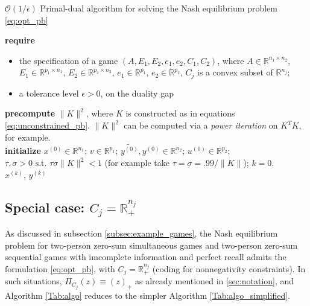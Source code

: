 \documentclass{article} %
\begin{document}
\begin{algorithm}[htb]
  \caption{$\mathcal{O}(1/\epsilon)$ Primal-dual algorithm for solving the Nash equilibrium problem \eqref{eq:opt_pb}}
  \textbf{require}
  \begin{itemize}
    \item the specification of a game $(A, E_1, E_2, e_1, e_2, C_1, C_2)$, where $A \in \mathbb{R}^{n_1 \times n_2}$,
  $E_1 \in \mathbb{R}^{p_1 \times n_1}$, $E_2 \in \mathbb{R}^{p_2 \times n_2}$, $e_1 \in \mathbb{R}^{p_1}$, $e_2 \in \mathbb{R}^{p_2}$, $C_j$ is a convex subset of $\mathbb{R}^{n_j}$;
      \item a tolerance level $\epsilon > 0$, on the duality gap
  \end{itemize}
  \textbf{precompute} $\|K\|^2$, where $K$ is constructed as in equations \eqref{eq:unconstrained_pb}. $\|K\|^2$ can be computed via a \textit{power iteration} on $K^TK$, for example.\\
  \textbf{initialize}
  $x^{(0)} \in \mathbb{R}^{n_1}$; $v \in \mathbb{R}^{p_1}$; $\tilde{y^{(0)}}, y^{(0)} \in \mathbb{R}^{n_2}$; $u^{(0)} \in \mathbb{R}^{p_2}$; 
  $\tau, \sigma > 0 \text{ s.t. }\tau\sigma \|K\|^2 < 1$ (for example take $\tau = \sigma = .99/\|K\|$); $k = 0$.\\
   \Return $x^{(k)}$, $y^{(k)}$
  \label{Tab:algo}
\end{algorithm}

\subsection{Special case: $C_j = \mathbb{R}^{n_j}_+$} As discussed in subsection \ref{subsec:example_games},
the Nash equilibrium problem for two-person zero-sum simultaneous games and two-person zero-sum sequential games with imcomplete
information and perfect recall admits the formulation \eqref{eq:opt_pb}, with $C_j = \mathbb{R}^{n_j}_+$ (coding for nonnegativity constraints).
In such situations, $\Pi_{C_j}(z) \equiv (z)_+$ as already mentioned in \ref{sec:notation}, and Algorithm \ref{Tab:algo} reduces to the simpler Algorithm \ref{Tab:algo_simplified}.
\end{document}
